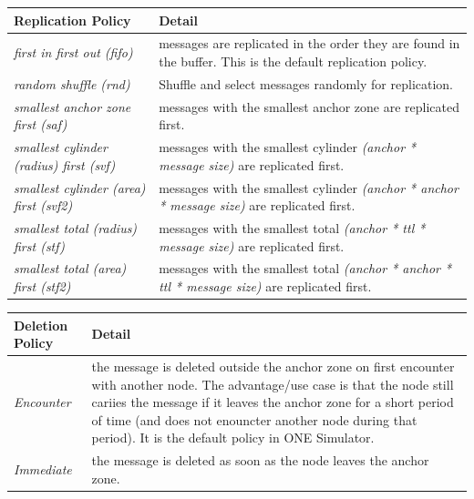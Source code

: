 \begin{center}
     \label{tab:title}
    \begin{tabular}{ | l | p{8cm} |}
    \hline
    \textbf{Replication Policy} & \textbf{Detail} \\ \hline
    \textit{first in first out (fifo)} & messages are replicated in the order they are found in the buffer. This is the default replication policy.\\ \hline
    \textit{random shuffle (rnd)} & Shuffle and select messages randomly for replication. \\ \hline
    \textit{smallest anchor zone first (saf)} & messages with the smallest anchor zone are replicated first.  \\ \hline
    \textit{smallest cylinder (radius) first (svf)} & messages with the smallest cylinder \textit{(anchor * message size)} are replicated first. \\ \hline
    \textit{smallest cylinder (area) first (svf2)} & messages with the smallest cylinder \textit{(anchor * anchor * message size)} are replicated first. \\ \hline
    \textit{smallest total (radius) first (stf)} & messages with the smallest total \textit{(anchor * ttl * message size)} are replicated first. \\ \hline
    \textit{smallest total (area) first (stf2)} & messages with the smallest total \textit{(anchor * anchor * ttl * message size)} are replicated first. \\ \hline

    \end{tabular}
\end{center}
\newpage
\begin{center}
     \label{tab:title}
    \begin{tabular}{ | l | p{11cm} |}
    \hline
    \textbf{Deletion Policy} & \textbf{Detail} \\ \hline
    \textit{Encounter} & the message is deleted outside the anchor zone on first encounter with another node. The advantage/use case is that the node still cariies the message if it leaves the anchor zone for a short period of time (and does not enouncter another node during that period). It is the default policy in ONE Simulator. \\ \hline
    \textit{Immediate} & the message is deleted as soon as the node leaves the anchor zone. \\ \hline
    \end{tabular}
\end{center}

